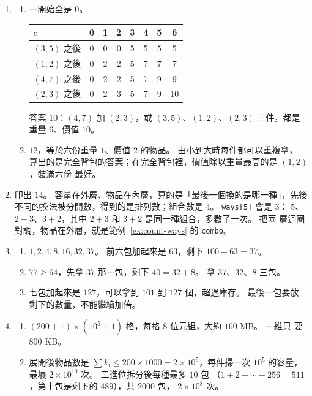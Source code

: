 \begin{enumerate}
\item
\begin{enumerate}
\item 一開始全是 $0$。
\begin{center}
\begin{tabular}{l|ccccccc}
\toprule
$c$ & 0 & 1 & 2 & 3 & 4 & 5 & 6 \\
\midrule
$(3, 5)$ 之後 & 0 & 0 & 0 & 5 & 5 & 5 & 5 \\
$(1, 2)$ 之後 & 0 & 2 & 2 & 5 & 7 & 7 & 7 \\
$(4, 7)$ 之後 & 0 & 2 & 2 & 5 & 7 & 9 & 9 \\
$(2, 3)$ 之後 & 0 & 2 & 3 & 5 & 7 & 9 & 10 \\
\bottomrule
\end{tabular}
\end{center}
答案 $10$：$(4, 7)$ 加 $(2, 3)$，或 $(3, 5)$、$(1, 2)$、$(2, 3)$ 三件，都是
重量 $6$、價值 $10$。
\item $12$，等於六份重量 $1$、價值 $2$ 的物品。 由小到大時每件都可以重複拿，
算出的是完全背包的答案；在完全背包裡，價值除以重量最高的是 $(1, 2)$，裝滿六份
最好。
\end{enumerate}

\item 印出 $14$。 容量在外層、物品在內層，算的是「最後一個換的是哪一種」，先後
不同的換法被分開數，得到的是排列數；組合數是 $4$。 \texttt{ways[5]} 會是 $3$：
$5$、$2 + 3$、$3 + 2$，其中 $2 + 3$ 和 $3 + 2$ 是同一種組合，多數了一次。 把兩
層迴圈對調，物品在外層，就是範例~\ref{ex:count-ways} 的 \texttt{combo}。

\item
\begin{enumerate}
\item $1, 2, 4, 8, 16, 32, 37$。 前六包加起來是 $63$，剩下 $100 - 63 = 37$。
\item $77 \ge 64$，先拿 $37$ 那一包，剩下 $40 = 32 + 8$。 拿 $37$、$32$、$8$
三包。
\item 七包加起來是 $127$，可以拿到 $101$ 到 $127$ 個，超過庫存。 最後一包要放
剩下的數量，不能繼續加倍。
\end{enumerate}

\item
\begin{enumerate}
\item $(200 + 1) \times (10^5 + 1)$ 格，每格 $8$ 位元組，大約 $160$ MB。 一維只
要 $800$ KB。
\item 展開後物品數是 $\sum k_i \le 200 \times 1000 = 2 \times 10^5$，每件掃一次
$10^5$ 的容量，最壞 $2 \times 10^{10}$ 次。 二進位拆分後每種最多 $10$ 包
（$1 + 2 + \cdots + 256 = 511$，第十包是剩下的 $489$），共 $2000$ 包，
$2 \times 10^8$ 次。
\end{enumerate}


\end{enumerate}

